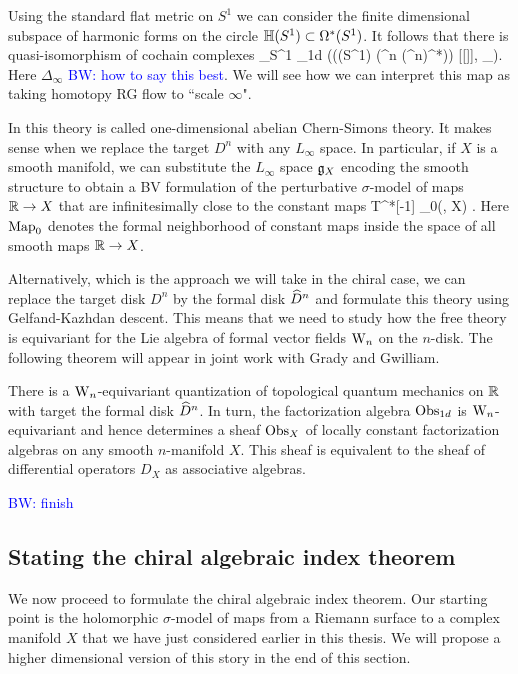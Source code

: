 \documentclass[10pt]{amsart}
\def\brian{\textcolor{blue}{BW: }\textcolor{blue}}
\begin{document}
Using the standard flat metric on $S^1$ we can consider the finite dimensional subspace of harmonic forms on the circle $\mathbb H(S^1) \subset \Omega^*(S^1)$. 
It follows that there is quasi-isomorphism of cochain complexes 
\ben
\int_{S^1} \Obs_{1d} \xto{\simeq} \left(\sO(\HH(S^1) \tensor (\RR^n \oplus (\RR^n)^*)) [[\hbar]], \hbar \Delta_\infty\right).
\een
Here $\Delta_\infty$ \brian{how to say this best}.
We will see how we can interpret this map as taking homotopy RG flow to ``scale $\infty$". 

In \cite{GradyGwilliamCS1} this theory is called one-dimensional abelian Chern-Simons theory. 
It makes sense when we replace the target $D^n$ with any $L_\infty$ space. 
In particular, if $X$ is a smooth manifold, we can substitute the $L_\infty$ space $\mathfrak g_X$ encoding the smooth structure to obtain a BV formulation of the perturbative $\sigma$-model of maps $\mathbb R \to X$ that are infinitesimally close to the constant maps
\ben
T^*[-1] _0(\RR, X) .
\een
Here ${\rm Map}_0$ denotes the formal neighborhood of constant maps inside the space of all smooth maps $\mathbb R \to X$. 

Alternatively, which is the approach we will take in the chiral case, we can replace the target disk $D^n$ by the formal disk $\widehat{D}^n$ and formulate this theory using Gelfand-Kazhdan descent. 
This means that we need to study how the free theory is equivariant for the Lie algebra of formal vector fields ${{\rm W}_n}$ on the $n$-disk. 
The following theorem will appear in joint work with Grady and Gwilliam.

\begin{thm}
There is a ${{\rm W}_n}$-equivariant quantization of topological quantum mechanics on $\mathbb R$ with target the formal disk $\widehat{D}^n$. 
In turn, the factorization algebra ${\rm Obs}_{1d}$ is ${{\rm W}_n}$-equivariant and hence determines a sheaf ${\rm Obs}_{X}$ of locally constant factorization algebras on any smooth $n$-manifold $X$. 
This sheaf is equivalent to the sheaf of differential operators $D_X$ as associative algebras.
\end{thm}

\brian{finish}

\subsection{Stating the chiral algebraic index theorem}

We now proceed to formulate the chiral algebraic index theorem. 
Our starting point is the holomorphic $\sigma$-model of maps from a Riemann surface to a complex manifold $X$ that we have just considered earlier in this thesis. 
We will propose a higher dimensional version of this story in the end of this section. 
\end{document}
